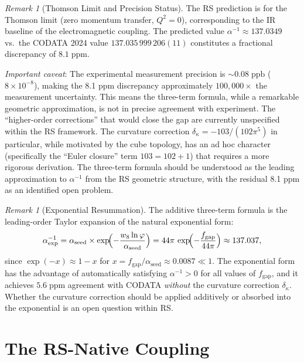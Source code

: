 \documentclass[12pt,a4paper]{article}
\theoremstyle{definition}
\theoremstyle{remark}
\newtheorem{remark}[theorem]{Remark}
\begin{document}
\begin{remark}[Thomson Limit and Precision Status]
\label{rem:precision}
The RS prediction is for the Thomson limit (zero momentum
transfer, $Q^2 = 0$), corresponding to the IR baseline of the
electromagnetic coupling.  The predicted value $\alpha^{-1} \approx
137.0349$ vs.\ the CODATA 2024 value $137.035\,999\,206(11)$
constitutes a fractional discrepancy of $8.1\;\mathrm{ppm}$.

\emph{Important caveat}: The experimental measurement precision is
$\sim 0.08\;\mathrm{ppb}$ ($8 \times 10^{-8}$), making the 8.1 ppm
discrepancy approximately $100{,}000 \times$ the measurement
uncertainty.  This means the three-term formula, while a remarkable
geometric approximation, is not in precise agreement with experiment.
The ``higher-order corrections'' that would close the gap are
currently unspecified within the RS framework.  The curvature
correction $\delta_\kappa = -103/(102\pi^5)$ in particular, while
motivated by the cube topology, has an ad hoc character (specifically
the ``Euler closure'' term $103 = 102 + 1$) that requires a more
rigorous derivation.  The three-term formula should be understood as
the leading approximation to $\alpha^{-1}$ from the RS geometric
structure, with the residual 8.1 ppm as an identified open problem.
\end{remark}

\begin{remark}[Exponential Resummation]
\label{rem:resum}
The additive three-term formula is the leading-order Taylor
expansion of the natural exponential form:
\begin{equation}
  \alpha^{-1}_{\mathrm{exp}} = \alpha_{\mathrm{seed}}
  \times \exp\!\Bigl(-\frac{w_8\ln\varphi}{\alpha_{\mathrm{seed}}}\Bigr)
  = 44\pi\,\exp\!\Bigl(-\frac{f_{\mathrm{gap}}}{44\pi}\Bigr)
  \approx 137.037,
\end{equation}
since $\exp(-x) \approx 1 - x$ for $x = f_{\mathrm{gap}}/\alpha_{\mathrm{seed}}
\approx 0.0087 \ll 1$.  The exponential form has the advantage of automatically
satisfying $\alpha^{-1} > 0$ for all values of $f_{\mathrm{gap}}$, and it achieves
$5.6\;\mathrm{ppm}$ agreement with CODATA \emph{without} the curvature correction
$\delta_\kappa$.  Whether the curvature correction should be applied additively
or absorbed into the exponential is an open question within RS.
\end{remark}

\section{The RS-Native Coupling}
\label{sec:native}
\end{document}
